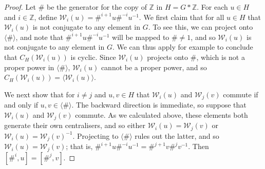 \documentclass[11pt]{amsart}
\theoremstyle{definition}
\numberwithin{theorem}{section}
\newcommand{\Z}{\mathbb{Z}}
\begin{document}
\begin{proof}
	Let \(\#\) be the generator for the copy of \(\Z\) in \(H = G \ast \Z\).
	For each \(u \in H\) and \(i \in \Z\), define \(\mathcal{W}_i(u) = \#^{i +
	1} u \#^{-i} u^{-1}\).  We first claim that for all \(u \in H\) that
	\(\mathcal W_i(u)\) is not conjugate to any element in \(G\). To see this,
	we can project onto \(\langle \# \rangle\), and note that \(\#^{i + 1} u
	\#^{-i} u^{-1}\) will be mapped to \(\# \neq 1\), and so \(\mathcal
	W_i(u)\) is not conjugate to any element in \(G\). We can thus apply for
	example \cite[Theorem 2.1]{BarkThesis} to conclude that \(C_H(\mathcal
	W_i(u))\) is cyclic. Since \(\mathcal W_i(u)\) projects onto \(\#\),
	which is not a proper power in \(\langle \# \rangle\), \(\mathcal W_i(u)\)
	cannot be a proper power, and so \(C_H(\mathcal W_i(u)) = \langle
	\mathcal W_i(u) \rangle\).

	We next show that for \(i \neq j\) and \(u, v \in H\) that \(\mathcal
	W_i(u)\) and \(\mathcal W_j(v)\) commute if and only if \(u, v \in \langle
	\# \rangle\).  The backward direction is immediate, so suppose that
	\(\mathcal W_i(u) \) and \(\mathcal W_j(v)\) commute. As we calculated
	above, these elements both generate their own centralisers, and so either
	\(\mathcal W_i(u) = \mathcal W_j(v)\) or \(\mathcal W_i(u) = \mathcal
	W_j(v)^{-1}\). Projecting to \(\langle \# \rangle\) rules out the latter,
	and so \(\mathcal W_i(u) = \mathcal W_j(v)\); that is, \(\#^{i + 1} u
	\#^{-i} u^{-1} = \#^{j + 1} v \#^j v^{-1}\). Then \([\#^i, u] = [\#^j,
	v]\). 


\end{proof}
\end{document}
